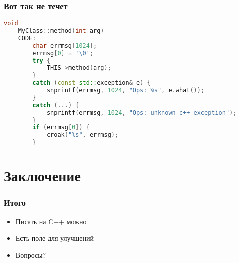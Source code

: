 \documentclass[utf8x,smaller]{beamer}
\begin{document}
\begin{frame}[fragile]
    \frametitle{Вот так не течет}
    \begin{lstlisting}[language=C++,style=PerlXS]
    void
    MyClass::method(int arg)
    CODE:
        char errmsg[1024];
        errmsg[0] = '\0';
        try {
            THIS->method(arg);
        }
        catch (const std::exception& e) {
            snprintf(errmsg, 1024, "Ops: %s", e.what());
        }
        catch (...) {
            snprintf(errmsg, 1024, "Ops: unknown c++ exception");
        }
        if (errmsg[0]) {
            croak("%s", errmsg);
        }
    \end{lstlisting}
\end{frame}

\section{Заключение}

\begin{frame}
    \frametitle{Итого}
    \begin{itemize}[<+->]
        \item Писать на C++ можно
        \item Есть поле для улучшений
        \item Вопросы?
    \end{itemize}
\end{frame}
\end{document}
